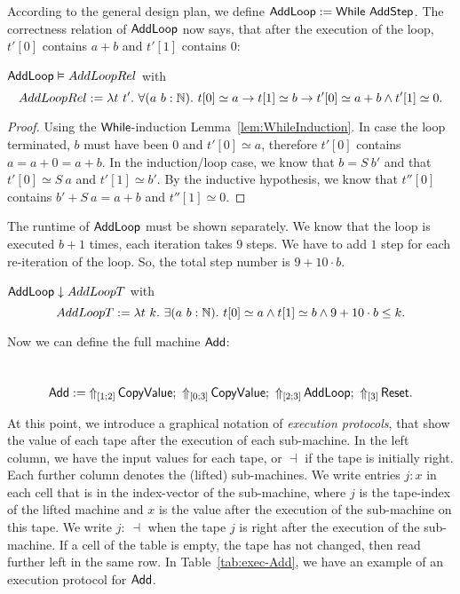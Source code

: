 According to the general design plan, we define $\MS{AddLoop} := \While~\MS{AddStep}$.  The correctness relation of $\MS{AddLoop}$ now says, that
after the execution of the loop, $t'[0]$ contains $a+b$ and $t'[1]$ contains $0$:
\begin{lemma}
  \label{lem:Add_Loop_Realise}
  $\MS{AddLoop} \Realise AddLoopRel$ with
  \[
    AddLoopRel := \lambda t~t'.~\forall (a~b:\Nat).~t[0] \simeq a \rightarrow t[1] \simeq b \rightarrow t'[0] \simeq a+b \land t'[1] \simeq 0.
  \]
\end{lemma}
\begin{proof}
  Using the $\While$-induction Lemma~\ref{lem:WhileInduction}.  In case the loop terminated, $b$ must have been $0$ and $t'[0] \simeq a$, therefore
  $t'[0]$ contains $a=a+0=a+b$.  In the induction/loop case, we know that $b=S~b'$ and that $t'[0] \simeq S~a$ and $t'[1] \simeq b'$.  By the
  inductive hypothesis, we know that $t''[0]$ contains $b' + S~a = a+b$ and $t''[1] \simeq 0$.
\end{proof}

The runtime of $\MS{AddLoop}$ must be shown separately.  We know that the loop is executed $b+1$ times, each iteration takes $9$ steps.  We have to
add $1$ step for each re-iteration of the loop.  So, the total step number is $9+10 \cdot b$.
\begin{lemma}
  \label{lem:Add_Loop_TerminatesIn}
  $\MS{AddLoop} \downarrow AddLoopT$ with
  \[
    AddLoopT := \lambda t~k.~\exists (a~b:\Nat).~t[0] \simeq a \land t[1] \simeq b \land 9+10 \cdot b \leq k.
  \]
\end{lemma}

Now we can define the full machine $\MS{Add}$:
\begin{definition}[$\MS{Add}$][Add]
  \label{def:Add}
  ~
  \[
    \MS{Add} :=
    \LiftTapes{\MS{CopyValue}}{\Vector{1;2}} \Seq
    \LiftTapes{\MS{CopyValue}}{\Vector{0;3}} \Seq
    \LiftTapes{\MS{AddLoop}}{\Vector{2;3}} \Seq
    \LiftTapes{\MS{Reset}}{\Vector{3}}.
  \]
\end{definition}

At this point, we introduce a graphical notation of \emph{execution protocols}, that show the value of each tape after the execution of each
sub-machine.  In the left column, we have the input values for each tape, or $\dashv$ if the tape is initially right.  Each further column denotes the
(lifted) sub-machines.  We write entries $j: x$ in each cell that is in the index-vector of the sub-machine, where $j$ is the tape-index of the lifted
machine and $x$ is the value after the execution of the sub-machine on this tape.  We write $j:~\dashv$ when the tape $j$ is right after the execution
of the sub-machine.  If a cell of the table is empty, the tape has not changed, then read further left in the same row.  In Table~\ref{tab:exec-Add},
we have an example of an execution protocol for $\MS{Add}$.

